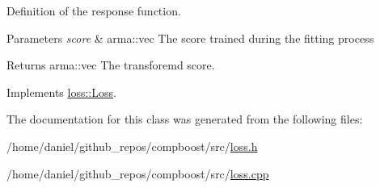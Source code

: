Definition of the response function. 


\begin{DoxyParams}{Parameters}
{\em score} & {\ttfamily arma\+::vec} The score trained during the fitting process\\
\hline
\end{DoxyParams}
\begin{DoxyReturn}{Returns}
{\ttfamily arma\+::vec} The transforemd score. 
\end{DoxyReturn}


Implements \hyperlink{classloss_1_1_loss_a0a84b7df79b08e40b538aaa7e6ee75c4}{loss\+::\+Loss}.



The documentation for this class was generated from the following files\+:\begin{DoxyCompactItemize}
\item 
/home/daniel/github\+\_\+repos/compboost/src/\hyperlink{loss_8h}{loss.\+h}\item 
/home/daniel/github\+\_\+repos/compboost/src/\hyperlink{loss_8cpp}{loss.\+cpp}\end{DoxyCompactItemize}
